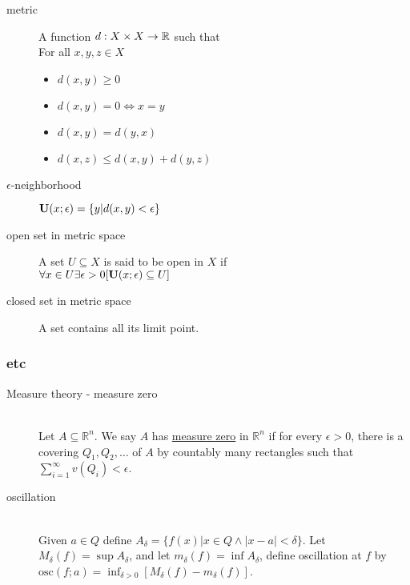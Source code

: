 \begin{description}
\item[metric]\label{def:metric}
	A function $d: X \times X \to {\mathbb R}$ such that \hfill\\
	For all $x, y, z \in X$
	\begin{itemize}
	\item $d(x, y)\geq 0$
	\item $d(x, y) = 0 \iff x=y$
	\item $d(x, y) = d(y, x)$
	\item $d(x, z) \leq d(x, y) + d(y, z)$
	\end{itemize}

\item[$\epsilon$-neighborhood]${\mathbf U}(x;\epsilon)=\{y|d(x,y)<\epsilon\}$

\item[open set in metric space]\label{def:metric:openset}
	A set $U\subseteq X$ is said to be open in $X$ if\hfill\\
		$\forall x\in U\exists \epsilon>0 [{\mathbf U}(x;\epsilon)\subseteq U]$\newline

\item[closed set in metric space]\label{def:metric:closedset}
	A set contains all its limit point.\hfill\\
\end{description}

\subsubsection{etc}

\begin{description}
\item[Measure theory - measure zero] \hfill \\
	Let $A\subseteq \mathbb{R}^n$. We say $A$ has \underline{measure zero}
	in $\mathbb{R}^n$ if for every $\epsilon>0$, there is a covering $Q_1, Q_2, \dots$ of $A$
	by countably many rectangles such that
	$\sum_{i=1}^\infty v(Q_i)<\epsilon$.

\item[oscillation] \hfill \\
	Given $a\in Q$ define $A_\delta=\{f(x)|x\in Q \wedge |x-a|<\delta\}$.
	Let $M_\delta(f) = \sup A_\delta$, and let $m_\delta(f) = \inf A_\delta$,
	define oscillation at $f$ by $\mathrm{osc}(f;a)=\inf_{\delta>0}[M_\delta(f)-m_\delta(f)]$.
\end{description}


